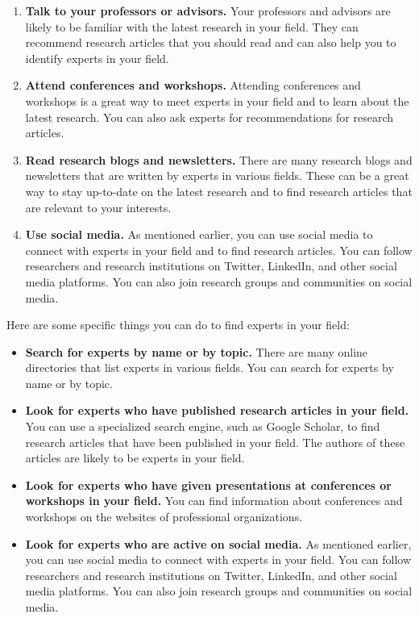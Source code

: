 \documentclass[
  b5paper]{book}
\begin{document}
\begin{enumerate}
\def\labelenumi{\arabic{enumi}.}
\item
  \textbf{Talk to your professors or advisors.} Your professors and advisors are likely to be familiar with the latest research in your field. They can recommend research articles that you should read and can also help you to identify experts in your field.
\item
  \textbf{Attend conferences and workshops.} Attending conferences and workshops is a great way to meet experts in your field and to learn about the latest research. You can also ask experts for recommendations for research articles.
\item
  \textbf{Read research blogs and newsletters.} There are many research blogs and newsletters that are written by experts in various fields. These can be a great way to stay up-to-date on the latest research and to find research articles that are relevant to your interests.
\item
  \textbf{Use social media.} As mentioned earlier, you can use social media to connect with experts in your field and to find research articles. You can follow researchers and research institutions on Twitter, LinkedIn, and other social media platforms. You can also join research groups and communities on social media.
\end{enumerate}

Here are some specific things you can do to find experts in your field:

\begin{itemize}
\item
  \textbf{Search for experts by name or by topic.} There are many online directories that list experts in various fields. You can search for experts by name or by topic.
\item
  \textbf{Look for experts who have published research articles in your field.} You can use a specialized search engine, such as Google Scholar, to find research articles that have been published in your field. The authors of these articles are likely to be experts in your field.
\item
  \textbf{Look for experts who have given presentations at conferences or workshops in your field.} You can find information about conferences and workshops on the websites of professional organizations.
\item
  \textbf{Look for experts who are active on social media.} As mentioned earlier, you can use social media to connect with experts in your field. You can follow researchers and research institutions on Twitter, LinkedIn, and other social media platforms. You can also join research groups and communities on social media.
\end{itemize}
\end{document}
